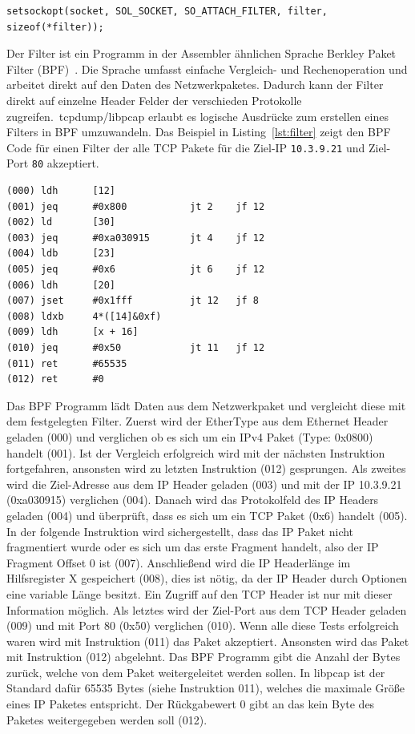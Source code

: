 \begin{lstlisting}[caption={Anhängen eines Filters an eine Socket},label=lst:attach]
setsockopt(socket, SOL_SOCKET, SO_ATTACH_FILTER, filter, sizeof(*filter));
\end{lstlisting}

Der Filter ist ein Programm in der Assembler ähnlichen Sprache Berkley Paket
Filter (BPF)~\cite{DBLP:conf/usenix/McCanneJ93}. Die Sprache umfasst einfache
Vergleich- und Rechenoperation und arbeitet direkt auf den Daten des
Netzwerkpaketes. Dadurch kann der Filter direkt auf einzelne Header Felder
der verschieden Protokolle zugreifen.\ tcpdump/libpcap erlaubt es logische
Ausdrücke zum erstellen eines Filters in BPF umzuwandeln. Das Beispiel
in Listing~\ref{lst:filter} zeigt den BPF Code für einen Filter der alle
TCP Pakete für die Ziel-IP \texttt{10.3.9.21} und Ziel-Port \texttt{80} akzeptiert.

\begin{lstlisting}[numbers=none,caption={BPF for \texttt{tcpdump -d ip dst host 10.3.9.21 and tcp dst port 80}},label={lst:filter}]
(000) ldh      [12]
(001) jeq      #0x800           jt 2    jf 12
(002) ld       [30]
(003) jeq      #0xa030915       jt 4    jf 12
(004) ldb      [23]
(005) jeq      #0x6             jt 6    jf 12
(006) ldh      [20]
(007) jset     #0x1fff          jt 12   jf 8
(008) ldxb     4*([14]&0xf)
(009) ldh      [x + 16]
(010) jeq      #0x50            jt 11   jf 12
(011) ret      #65535
(012) ret      #0
\end{lstlisting}

Das BPF Programm lädt Daten aus dem Netzwerkpaket und vergleicht diese mit dem
festgelegten Filter. Zuerst wird der EtherType aus dem Ethernet Header geladen
(000) und verglichen ob es sich um ein IPv4 Paket (Type: 0x0800) handelt (001).
Ist der Vergleich erfolgreich wird mit der nächsten Instruktion fortgefahren,
ansonsten wird zu letzten Instruktion (012) gesprungen. Als zweites wird die
Ziel-Adresse aus dem IP Header geladen (003) und mit der IP 10.3.9.21
(0xa030915) verglichen (004). Danach wird das Protokolfeld des IP Headers
geladen (004) und überprüft, dass es sich um ein TCP Paket (0x6) handelt (005).
In der folgende Instruktion wird sichergestellt, dass das IP Paket nicht
fragmentiert wurde oder es sich um das erste Fragment handelt, also der IP
Fragment Offset 0 ist (007). Anschließend wird die IP Headerlänge im
Hilfsregister X gespeichert (008), dies ist nötig, da der IP Header durch
Optionen eine variable Länge besitzt. Ein Zugriff auf den TCP Header ist nur
mit dieser Information möglich. Als letztes wird der Ziel-Port aus dem TCP
Header geladen (009) und mit Port 80 (0x50) verglichen (010). Wenn alle diese
Tests erfolgreich waren wird mit Instruktion (011) das Paket akzeptiert.
Ansonsten wird das Paket mit Instruktion (012) abgelehnt. Das BPF Programm gibt
die Anzahl der Bytes zurück, welche von dem Paket weitergeleitet werden sollen.
In libpcap ist der Standard dafür 65535 Bytes (siehe Instruktion 011), welches
die maximale Größe eines IP Paketes entspricht. Der Rückgabewert 0 gibt an
das kein Byte des Paketes weitergegeben werden soll (012).

